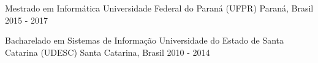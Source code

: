 

\begin{cventries}
	

  \cventry
	{Mestrado em Informática} %
	{Universidade Federal do Paraná (UFPR)} %
	{Paraná, Brasil} %
	{2015 - 2017} %
	{		
	}

	\cventry
	{Bacharelado em Sistemas de Informação} %
	{Universidade do Estado de Santa Catarina (UDESC)} %
	{Santa Catarina, Brasil} %
	{2010 - 2014} %
	{
	}	

\end{cventries}
